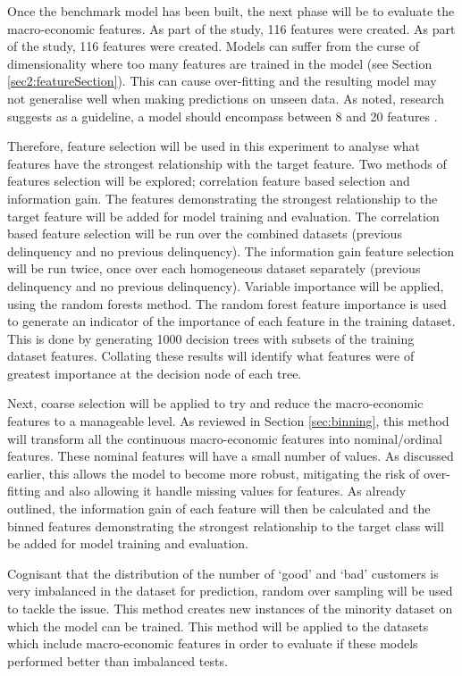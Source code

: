 Once the benchmark model has been built, the next phase will be to evaluate the macro-economic features. As part of the study, 116 features were created. As part of the study, 116 features were created. Models can suffer from the curse of dimensionality where too many features are trained in the model (see Section \ref{sec2:featureSection}). This can cause over-fitting and the resulting model may not generalise well when making predictions on unseen data. As noted, research suggests as a guideline, a model should encompass between 8 and 20 features \citep{thomas_consumer_2009, mays_credit_2004}.

Therefore, feature selection will be used in this experiment to analyse what features have the strongest relationship with the target feature. Two methods of features selection will be explored; correlation feature based selection and information gain. The features demonstrating the strongest relationship to the target feature will be added for model training and evaluation. The correlation based feature selection will be run over the combined datasets (previous delinquency and no previous delinquency). The information gain feature selection will be run twice, once over each homogeneous dataset separately (previous delinquency and no previous delinquency). Variable importance will be applied, using the random forests method. The random forest feature importance is used to generate an indicator of the importance of each feature in the training dataset. This is done by generating 1000 decision trees with subsets of the training dataset features. Collating these results will identify what features were of greatest importance at the decision node of each tree.

Next, coarse selection will be applied to try and reduce the macro-economic features to a manageable level. As reviewed in Section \ref{sec:binning}, this method will transform all the continuous macro-economic features into nominal/ordinal features. These nominal features will have a small number of values. As discussed earlier, this allows the model to become more robust, mitigating the risk of over-fitting and also allowing it handle missing values for features. As already outlined, the information gain of each feature will then be calculated and the binned features demonstrating the strongest relationship to the target class will be added for model training and evaluation. 

Cognisant that the distribution of the number of `good' and `bad' customers is very imbalanced in the dataset for prediction, random over sampling will be used to tackle the issue. This method creates new instances of the minority dataset on which the model can be trained. This method will be applied to the datasets which include macro-economic features in order to evaluate if these models performed better than imbalanced tests.

